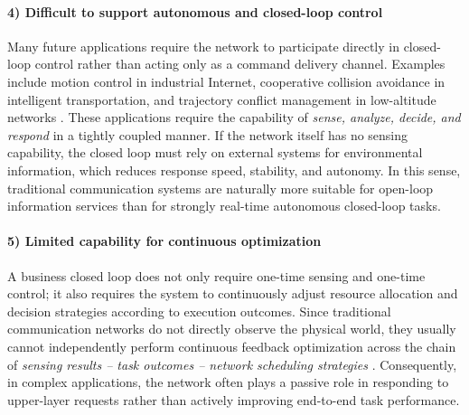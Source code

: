 \paragraph{4) Difficult to support autonomous and closed-loop control}
Many future applications require the network to participate directly in closed-loop control rather than acting only as a command delivery channel. Examples include motion control in industrial Internet, cooperative collision avoidance in intelligent transportation, and trajectory conflict management in low-altitude networks \cite{Saad2020Vision6G, Liu2022ISAC}. These applications require the capability of \emph{sense, analyze, decide, and respond} in a tightly coupled manner. If the network itself has no sensing capability, the closed loop must rely on external systems for environmental information, which reduces response speed, stability, and autonomy. In this sense, traditional communication systems are naturally more suitable for open-loop information services than for strongly real-time autonomous closed-loop tasks.

\paragraph{5) Limited capability for continuous optimization}
A business closed loop does not only require one-time sensing and one-time control; it also requires the system to continuously adjust resource allocation and decision strategies according to execution outcomes. Since traditional communication networks do not directly observe the physical world, they usually cannot independently perform continuous feedback optimization across the chain of \emph{sensing results -- task outcomes -- network scheduling strategies} \cite{IMT2030Framework, Letaief2019Roadmap}. Consequently, in complex applications, the network often plays a passive role in responding to upper-layer requests rather than actively improving end-to-end task performance.

